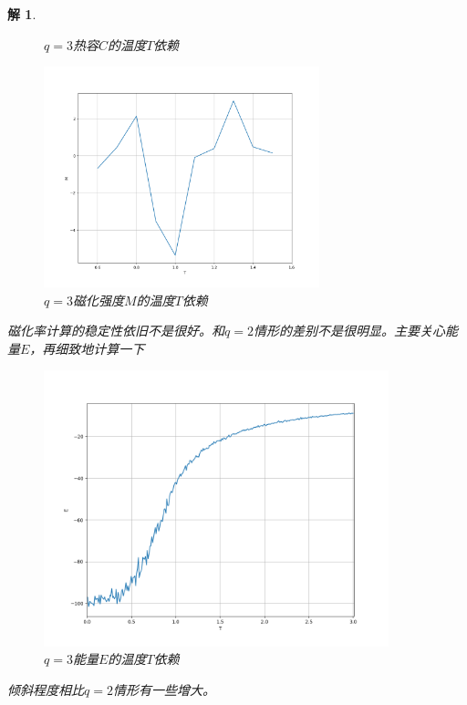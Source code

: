 \documentclass[10pt]{ctexart}
\newtheorem*{solution}{解}
\begin{document}
\begin{solution}
\begin{figure}[H]
\begin{minipage}{0.45\linewidth}
            \caption{$q=3$热容$C$的温度$T$依赖}
        \end{minipage}
        \qquad
        \begin{minipage}{0.45\linewidth}
            \centering
            \includegraphics[width=8cm]{q3_M.png}
            \caption{$q=3$磁化强度$M$的温度$T$依赖}
        \end{minipage}
    \end{figure}
    磁化率计算的稳定性依旧不是很好。和$q=2$情形的差别不是很明显。主要关心能量$E$，再细致地计算一下
    \begin{figure}[H]
        \centering
        \includegraphics[width=10cm]{q3_E_.png}
        \caption{$q=3$能量$E$的温度$T$依赖}
    \end{figure}
    倾斜程度相比$q=2$情形有一些增大。


\end{solution}
\end{document}
